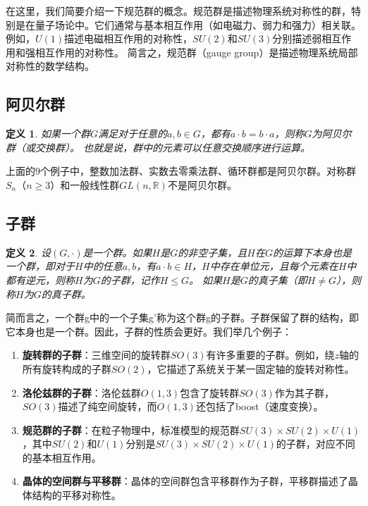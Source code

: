 \documentclass{ctexart}%
\newtheorem{definition}{定义}
\begin{document}
在这里，我们简要介绍一下规范群的概念。规范群是描述物理系统对称性的群，特别是在量子场论中。它们通常与基本相互作用（如电磁力、弱力和强力）相关联。例如，$U(1)$描述电磁相互作用的对称性，$SU(2)$和$SU(3)$分别描述弱相互作用和强相互作用的对称性。
简言之，规范群（gauge group）是描述物理系统局部对称性的数学结构。
\subsection{阿贝尔群}
\begin{definition}
    如果一个群$G$满足对于任意的$a, b \in G$，都有$a \cdot b = b \cdot a$，则称$G$为阿贝尔群（或交换群）。  
    也就是说，群中的元素可以任意交换顺序进行运算。
\end{definition}
上面的9个例子中，整数加法群、实数去零乘法群、循环群都是阿贝尔群。对称群$S_n$（$n \geq 3$）和一般线性群$GL(n, \mathbb{R})$不是阿贝尔群。
\subsection{子群}
\begin{definition}  
    设$(G, \cdot)$是一个群。如果$H$是$G$的非空子集，且$H$在$G$的运算下本身也是一个群，即对于$H$中的任意$a, b$，有$a \cdot b \in H$，$H$中存在单位元，且每个元素在$H$中都有逆元，则称$H$为$G$的子群，记作$H \leq G$。
    如果$H$是$G$的真子集（即$H \neq G$），则称$H$为$G$的真子群。
\end{definition}   
简而言之，一个群g中的一个子集g'称为这个群g的子群。子群保留了群的结构，即它本身也是一个群。因此，子群的性质会更好。我们举几个例子：
\begin{enumerate}
    \item \textbf{旋转群的子群}：三维空间的旋转群$SO(3)$有许多重要的子群。例如，绕$z$轴的所有旋转构成的子群$SO(2)$，它描述了系统关于某一固定轴的旋转对称性。
    \item \textbf{洛伦兹群的子群}：洛伦兹群$O(1,3)$包含了旋转群$SO(3)$作为其子群，$SO(3)$描述了纯空间旋转，而$O(1,3)$还包括了boost（速度变换）。
    \item \textbf{规范群的子群}：在粒子物理中，标准模型的规范群$SU(3)\times SU(2)\times U(1)$，其中$SU(2)$和$U(1)$分别是$SU(3)\times SU(2)\times U(1)$的子群，对应不同的基本相互作用。
    \item \textbf{晶体的空间群与平移群}：晶体的空间群包含平移群作为子群，平移群描述了晶体结构的平移对称性。
\end{enumerate}
\end{document}
